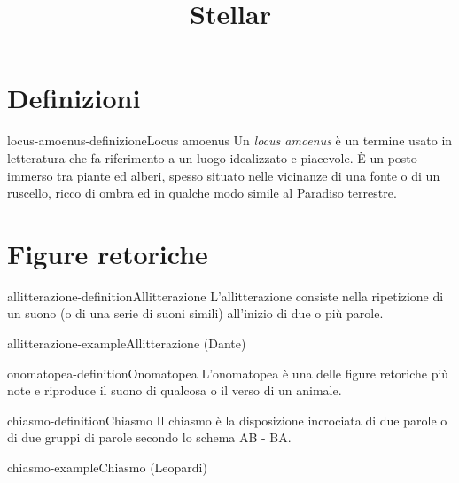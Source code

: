 \documentclass[preview]{standalone}
\begin{document}
\title{Stellar}
\genpage

\section{Definizioni}

\begin{snippetdefinition}{locus-amoenus-definizione}{Locus amoenus}
    Un \textit{locus amoenus} è un termine usato in letteratura
    che fa riferimento a un luogo idealizzato e piacevole.
    È un posto immerso tra piante ed alberi,
    spesso situato nelle vicinanze di una fonte o di un ruscello,
    ricco di ombra ed in qualche modo simile al Paradiso terrestre. 
\end{snippetdefinition}

\section{Figure retoriche}

\begin{snippetdefinition}{allitterazione-definition}{Allitterazione}
    L'allitterazione consiste nella ripetizione di un suono
    (o di una serie di suoni simili) all'inizio di due o più parole.
\end{snippetdefinition}

\begin{snippetexample}{allitterazione-example}{Allitterazione}
     (Dante)
\end{snippetexample}

\begin{snippetdefinition}{onomatopea-definition}{Onomatopea}
    L'onomatopea è una delle figure retoriche più note e riproduce il suono di qualcosa o il verso di un animale.
\end{snippetdefinition}

\begin{snippetdefinition}{chiasmo-definition}{Chiasmo}
    Il chiasmo è la disposizione incrociata di due parole o di due gruppi di parole secondo lo schema AB - BA.
\end{snippetdefinition}

\begin{snippetexample}{chiasmo-example}{Chiasmo}
     (Leopardi)
\end{snippetexample}


\end{document}
